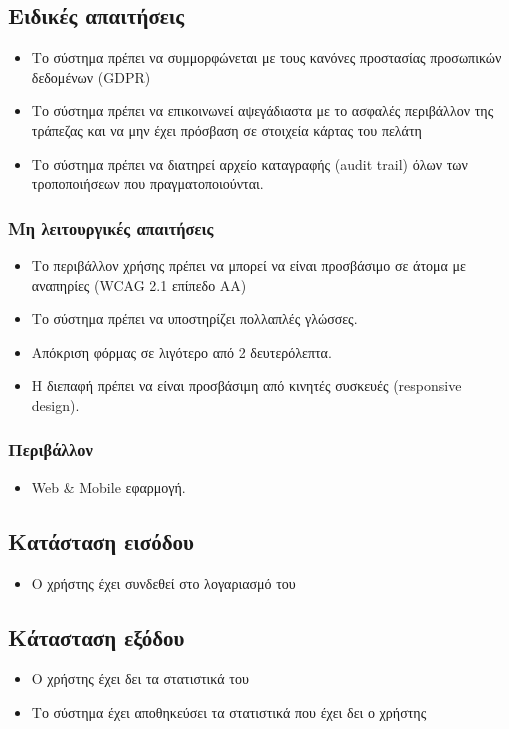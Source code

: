 \documentclass[12pt,a4paper,twoside]{book}
\begin{document}
\subsection{Ειδικές απαιτήσεις} %
\begin{itemize}
  \item Το σύστημα πρέπει να συμμορφώνεται με τους κανόνες προστασίας προσωπικών δεδομένων (GDPR)  %
  \item Το σύστημα πρέπει να επικοινωνεί αψεγάδιαστα με το ασφαλές περιβάλλον της τράπεζας και να μην έχει πρόσβαση σε στοιχεία κάρτας του πελάτη   %
  \item Το σύστημα πρέπει να διατηρεί αρχείο καταγραφής (audit trail) όλων των τροποποιήσεων που πραγματοποιούνται. %
\end{itemize}

\subsubsection{Μη λειτουργικές απαιτήσεις}
\begin{itemize}
  \item Το περιβάλλον χρήσης πρέπει να μπορεί να  είναι προσβάσιμο σε  άτομα με αναπηρίες (WCAG 2.1 επίπεδο AA) %
  \item Το σύστημα πρέπει να υποστηρίζει πολλαπλές γλώσσες.
  \item Απόκριση φόρμας σε λιγότερο από 2 δευτερόλεπτα. %
  \item Η διεπαφή πρέπει να είναι προσβάσιμη από κινητές συσκευές (responsive design). %
\end{itemize}

\subsubsection{Περιβάλλον}
\begin{itemize}
  \item Web \& Mobile εφαρμογή.
\end{itemize}

\subsection{Κατάσταση εισόδου} %
\begin{itemize}
  \item Ο χρήστης έχει συνδεθεί στο λογαριασμό του %
\end{itemize}

\subsection{Κάτασταση εξόδου} %
\begin{itemize}
  \item Ο χρήστης έχει δει τα στατιστικά του %
  \item Το σύστημα έχει αποθηκεύσει τα στατιστικά που έχει δει ο χρήστης %
\end{itemize}
\end{document}
